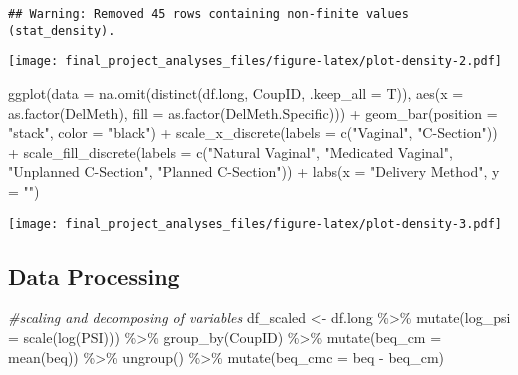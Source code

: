 \documentclass[
]{article}
\newenvironment{Shaded}{\begin{snugshade}}{\end{snugshade}}
\newcommand{\AttributeTok}[1]{\textcolor[rgb]{0.77,0.63,0.00}{#1}}
\newcommand{\CommentTok}[1]{\textcolor[rgb]{0.56,0.35,0.01}{\textit{#1}}}
\newcommand{\FunctionTok}[1]{\textcolor[rgb]{0.00,0.00,0.00}{#1}}
\newcommand{\NormalTok}[1]{#1}
\newcommand{\OtherTok}[1]{\textcolor[rgb]{0.56,0.35,0.01}{#1}}
\newcommand{\SpecialCharTok}[1]{\textcolor[rgb]{0.00,0.00,0.00}{#1}}
\newcommand{\StringTok}[1]{\textcolor[rgb]{0.31,0.60,0.02}{#1}}
\begin{document}
\begin{verbatim}
## Warning: Removed 45 rows containing non-finite values (stat_density).
\end{verbatim}

\texttt{[image: final\_project\_analyses\_files/figure-latex/plot-density-2.pdf]}

\begin{Shaded}
\begin{Highlighting}[]
\FunctionTok{ggplot}\NormalTok{(}\AttributeTok{data =} \FunctionTok{na.omit}\NormalTok{(}\FunctionTok{distinct}\NormalTok{(df.long, CoupID, }\AttributeTok{.keep\_all =}\NormalTok{ T)), }
       \FunctionTok{aes}\NormalTok{(}\AttributeTok{x =} \FunctionTok{as.factor}\NormalTok{(DelMeth), }
           \AttributeTok{fill =} \FunctionTok{as.factor}\NormalTok{(DelMeth.Specific))) }\SpecialCharTok{+} 
  \FunctionTok{geom\_bar}\NormalTok{(}\AttributeTok{position =} \StringTok{"stack"}\NormalTok{, }\AttributeTok{color =} \StringTok{"black"}\NormalTok{) }\SpecialCharTok{+} 
  \FunctionTok{scale\_x\_discrete}\NormalTok{(}\AttributeTok{labels =} \FunctionTok{c}\NormalTok{(}\StringTok{"Vaginal"}\NormalTok{, }\StringTok{"C{-}Section"}\NormalTok{)) }\SpecialCharTok{+} 
  \FunctionTok{scale\_fill\_discrete}\NormalTok{(}\AttributeTok{labels =} \FunctionTok{c}\NormalTok{(}\StringTok{"Natural Vaginal"}\NormalTok{, }\StringTok{"Medicated Vaginal"}\NormalTok{, }\StringTok{"Unplanned C{-}Section"}\NormalTok{, }\StringTok{"Planned C{-}Section"}\NormalTok{)) }\SpecialCharTok{+}
  \FunctionTok{labs}\NormalTok{(}\AttributeTok{x =} \StringTok{"Delivery Method"}\NormalTok{, }\AttributeTok{y =} \StringTok{""}\NormalTok{)}
\end{Highlighting}
\end{Shaded}

\texttt{[image: final\_project\_analyses\_files/figure-latex/plot-density-3.pdf]}

\hypertarget{data-processing}{%
\subsection{Data Processing}\label{data-processing}}

\begin{Shaded}
\begin{Highlighting}[]
\CommentTok{\#scaling and decomposing of variables}
\NormalTok{df\_scaled }\OtherTok{\textless{}{-}}\NormalTok{ df.long }\SpecialCharTok{\%\textgreater{}\%} \FunctionTok{mutate}\NormalTok{(}\AttributeTok{log\_psi =} \FunctionTok{scale}\NormalTok{(}\FunctionTok{log}\NormalTok{(PSI))) }\SpecialCharTok{\%\textgreater{}\%}
  \FunctionTok{group\_by}\NormalTok{(CoupID) }\SpecialCharTok{\%\textgreater{}\%} \FunctionTok{mutate}\NormalTok{(}\AttributeTok{beq\_cm =} \FunctionTok{mean}\NormalTok{(beq)) }\SpecialCharTok{\%\textgreater{}\%} \FunctionTok{ungroup}\NormalTok{() }\SpecialCharTok{\%\textgreater{}\%} \FunctionTok{mutate}\NormalTok{(}\AttributeTok{beq\_cmc =}\NormalTok{ beq }\SpecialCharTok{{-}}\NormalTok{ beq\_cm)}
\end{Highlighting}
\end{Shaded}
\end{document}
